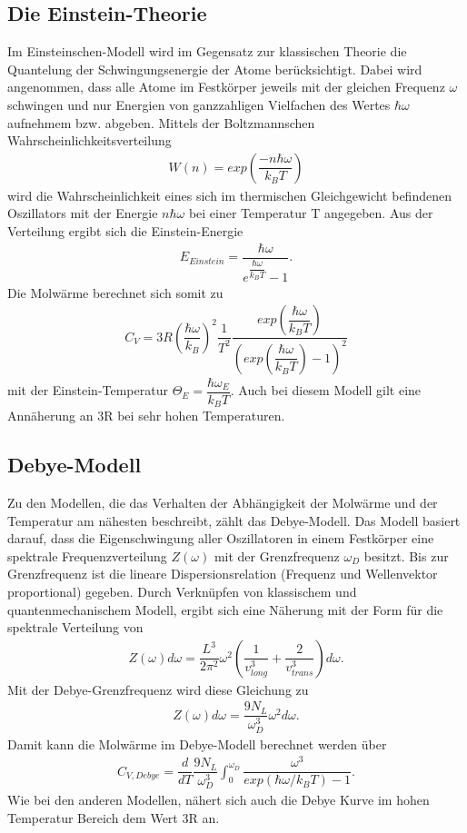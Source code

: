 \documentclass{article}
\begin{document}
\subsection{Die Einstein-Theorie}
Im Einsteinschen-Modell wird im Gegensatz zur klassischen Theorie die Quantelung der Schwingungsenergie der Atome berücksichtigt. Dabei wird angenommen, dass alle Atome im Festkörper jeweils mit der gleichen Frequenz $\omega$ schwingen und nur Energien von ganzzahligen Vielfachen des Wertes $\hbar\omega$ aufnehmem bzw. abgeben. Mittels der Boltzmannschen Wahrscheinlichkeitsverteilung 
\begin{align}
W(n)=exp(\dfrac{-n\hbar \omega}{k_BT})
\end{align}
wird die Wahrscheinlichkeit eines sich im thermischen Gleichgewicht befindenen Oszillators mit der Energie $n\hbar\omega$ bei einer Temperatur T angegeben. Aus der Verteilung ergibt sich die Einstein-Energie
\begin{align}
E_{Einstein}=\dfrac{\hbar\omega}{e^{\dfrac{\hbar \omega}{k_BT}}-1}.
\end{align}
Die Molwärme berechnet sich somit zu 
\begin{align}
C_V=3R\left(\dfrac{\hbar\omega}{k_B}\right)^2 \dfrac{1}{T^2} \dfrac{exp(\dfrac{\hbar\omega}{k_BT})}{(exp(\dfrac{\hbar \omega}{k_BT})-1)^2}
\end{align}
mit der Einstein-Temperatur $\Theta_E=\dfrac{\hbar \omega_E}{k_BT}$. Auch bei diesem Modell gilt eine Annäherung an 3R bei sehr hohen Temperaturen. 
\subsection{Debye-Modell}
Zu den Modellen, die das Verhalten der Abhängigkeit der Molwärme und der Temperatur am nähesten beschreibt, zählt das Debye-Modell. Das Modell basiert darauf, dass die Eigenschwingung aller Oszillatoren in einem Festkörper eine spektrale Frequenzverteilung $Z(\omega)$ mit der  Grenzfrequenz $\omega_D$ besitzt. Bis zur Grenzfrequenz ist die lineare Dispersionsrelation (Frequenz und Wellenvektor proportional) gegeben. Durch Verknüpfen von klassischem und quantenmechanischem Modell, ergibt sich eine Näherung mit der Form für die spektrale Verteilung von 
\begin{align}
Z(\omega)d\omega=\dfrac{L^3}{2\pi^2}\omega^2\left(\dfrac{1}{v_{long}^3}+\dfrac{2}{v_{trans}^3}\right)d\omega.
\end{align}
Mit der Debye-Grenzfrequenz wird diese Gleichung zu 
\begin{align}
Z(\omega)d\omega=\dfrac{9N_L}{\omega_D^3}\omega^2 d\omega.
\end{align}
Damit kann die Molwärme im Debye-Modell berechnet werden über
\begin{align}
C_{V,Debye}=\dfrac{d}{dT}\dfrac{9N_L}{\omega_D^3}\int_{0}^{\omega_D}\dfrac{\omega^3}{exp(\hbar\omega/k_BT)-1}.
\end{align}
Wie bei den anderen Modellen, nähert sich auch die Debye Kurve im hohen Temperatur Bereich dem Wert 3R an. 
\end{document}
